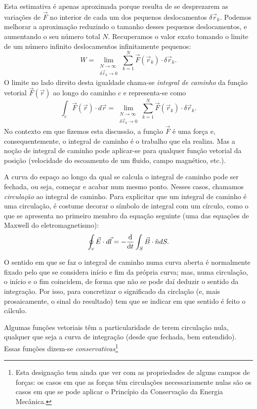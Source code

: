 Esta estimativa é apenas aproximada porque resulta de se desprezarem as
variações de $\vec F$ no interior de cada um dos pequenos deslocamentos $\delta
\vec r_k$. Podemos melhorar a aproximação reduzindo o tamanho desses pequenos
deslocamentos, e aumentando o seu número total $N$. Recuperamos o valor exato
tomando o limite de um número infinito deslocamentos infinitamente pequenos:
\begin{equation*}
W=\lim_{\substack{N\to\infty\\ \delta\vec r_k\to0}}\sum_{k=1}^N \vec F(\vec r_k)\cdot\delta\vec r_k.
\end{equation*}
O limite no lado direito desta igualdade chama-se \emph{integral de caminho} da
função vetorial $\vec F(\vec r)$ ao longo do caminho $c$ e representa-se como
\begin{equation}
\int_c\vec F(\vec r)\cdot d\vec r=\lim_{\substack{N\to\infty\\
\delta\vec r_k\to0}}\sum_{k=1}^N \vec F(\vec r_k)\cdot\delta\vec r_k.
\end{equation}
No contexto em que fizemos esta discussão, a função $\vec F$ é uma força e,
consequentemente, o integral de caminho é o trabalho que ela realiza. Mas a
noção de integral de caminho pode aplicar-se para qualquer função vetorial da
posição (velocidade do escoamento de um fluido, campo magnético, etc.).

A curva do espaço ao longo da qual se calcula o integral de caminho pode ser
fechada, ou seja, começar e acabar num mesmo ponto. Nesses casos, chamamos
\emph{circulação} ao integral de caminho. Para explicitar que um integral de
caminho é uma circulação, é costume decorar o símbolo de integral com um
círculo, como o que se apresenta no primeiro membro da equação seguinte (uma das
equações de Maxwell do eletromagnetismo):
\begin{equation*}
  \oint_c \vec E\cdot d\vec l = -\td{}{t}\int_{S}\vec B\cdot\hat ndS.
\end{equation*}

O sentido em que se faz o integral de caminho numa curva aberta é normalmente
fixado pelo que se considera início e fim da própria curva; mas, numa
circulação, o início e o fim coincidem, de forma que não se pode daí deduzir o
sentido da integração. Por isso, para concretizar o significado da circlação (e,
mais prosaicamente, o sinal do resultado) tem que se indicar em que sentido é
feito o cálculo.

Algumas funções vetoriais têm a particularidade de terem circulação nula,
qualquer que seja a curva de integração (desde que fechada, bem entendido).
Essas funções dizem-se \emph{conservativas}\footnote{Esta designação tem ainda
  que ver com as propriedades de alguns campos de forças: os casos em que as
  forças têm circulações necessariamente nulas são os casos em que se pode
aplicar o Princípio da Conservação da Energia Mecânica.}

